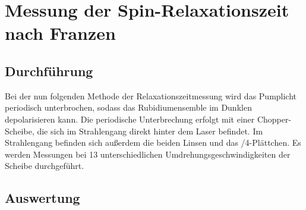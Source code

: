 \section{Messung der Spin-Relaxationszeit nach Franzen}
\subsection{Durchführung}
Bei der nun folgenden Methode der Relaxationszeitmessung wird das Pumplicht periodisch unterbrochen,
sodass das Rubidiumensemble im Dunklen depolarisieren kann.
Die periodische Unterbrechung erfolgt mit einer Chopper-Scheibe,
die sich im Strahlengang direkt hinter dem Laser befindet.
Im Strahlengang befinden sich außerdem die beiden Linsen und das \textlambda/4-Plättchen.
Es werden Messungen bei 13 unterschiedlichen Umdrehungsgeschwindigkeiten der Scheibe durchgeführt.


\subsection{Auswertung}